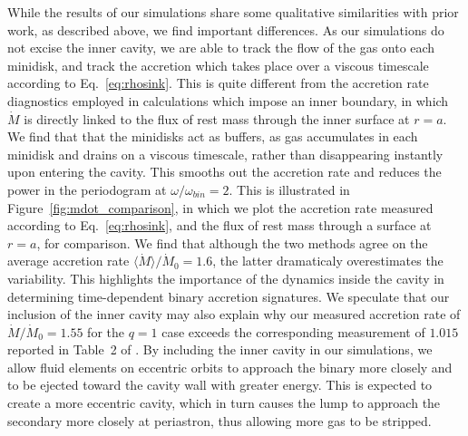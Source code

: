\documentclass[apj]{emulateapj}
\begin{document}
While the results of our simulations share some qualitative similarities with prior work, as described above, we find important differences. As our simulations do not excise the inner cavity, we are able to track the flow of the gas onto each minidisk, and track the accretion which takes place over a viscous timescale according to Eq.~\ref{eq:rhosink}. This is quite different from the accretion rate diagnostics employed in calculations which impose an inner boundary, in which $\dot{M}$ is directly linked to the flux of rest mass through the inner surface at $r=a$. We find that that the minidisks act as buffers, as gas accumulates in each minidisk and drains on a viscous timescale, rather than disappearing instantly upon entering the cavity. This smooths out the accretion rate and reduces the power in the periodogram at $\omega / \omega_{bin}=2$. This is illustrated in Figure~\ref{fig:mdot_comparison}, in which we plot the accretion rate measured according to Eq.~\ref{eq:rhosink}, and the flux of rest mass through a surface at $r=a$, for comparison. We find that although the two methods agree on the average accretion rate $\langle \dot{M} \rangle / \dot{M}_0 = 1.6$, the latter dramaticaly overestimates the variability. This highlights the importance of the dynamics inside the cavity in determining time-dependent binary accretion signatures. We speculate that our inclusion of the inner cavity may also explain why our measured accretion rate of $\dot{M} / \dot{M}_0 = 1.55$ for the $q=1$ case exceeds the corresponding measurement of $1.015$ reported in Table~2 of \citet{dorazio13}. By including the inner cavity in our simulations, we allow fluid elements on eccentric orbits to approach the binary more closely and to be ejected toward the cavity wall with greater energy. This is expected to create a more eccentric cavity, which in turn causes the lump to approach the secondary more closely at periastron, thus allowing more gas to be stripped.
\end{document}

